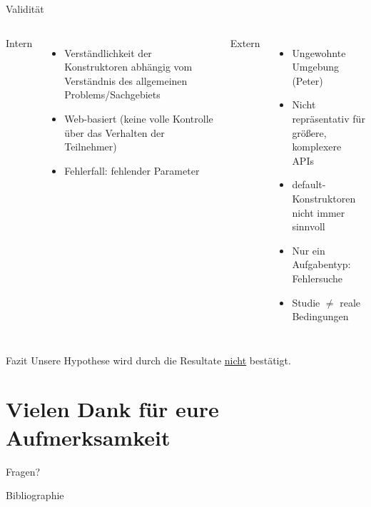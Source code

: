 \documentclass[10pt]{beamer}
\begin{document}
	\begin{frame}{Validität}
		\begin{columns}[T,onlytextwidth]
	
			Intern
			\begin{itemize}
				\item Verständlichkeit der Konstruktoren abhängig vom Verständnis des allgemeinen Problems/Sachgebiets
				\item Web-basiert (keine volle Kontrolle über das Verhalten der Teilnehmer)
				\item Fehlerfall: fehlender Parameter
			\end{itemize}
		
			Extern
			\begin{itemize}
				\item Ungewohnte Umgebung (Peter)
				\item Nicht repräsentativ für größere, komplexere APIs
				\item default-Konstruktoren nicht immer sinnvoll
				\item Nur ein Aufgabentyp: Fehlersuche
				\item Studie $\neq$ reale Bedingungen
			\end{itemize}
		\end{columns}	
	
	\end{frame}
	
	\begin{frame}[standout]{Fazit}
		Unsere Hypothese wird durch die Resultate \underline{nicht} bestätigt.
	\end{frame}

\section{Vielen Dank für eure Aufmerksamkeit}

\appendix

	\begin{frame}[standout]
		Fragen?
	\end{frame}

	\begin{frame}[allowframebreaks]{Bibliographie}
		
		
	\end{frame}

\end{document}
